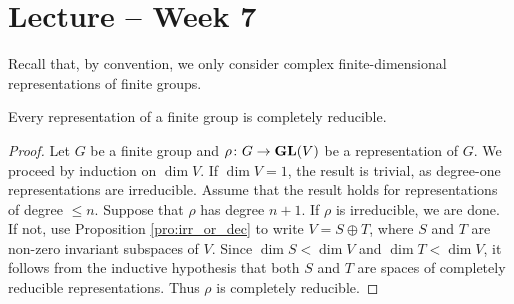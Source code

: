 \section{Lecture -- Week 7}
\label{7}

Recall that, by convention, we only consider complex 
finite-dimensional representations of finite groups.

\begin{theorem}[Maschke]
    Every representation of a finite group is completely reducible.
\end{theorem}

\begin{proof}
    Let $G$ be a finite group and $\rho\colon G\to\mathbf{GL}(V)$ be a representation of $G$. We proceed
    by induction on $\dim V$.
    If $\dim V=1$, the result is trivial, as degree-one representations are irreducible. Assume that
    the result holds for representations of degree $\leq n$. Suppose that $\rho$ has degree $n+1$. 
    If $\rho$ is irreducible, we are done. If not, use 
    Proposition \ref{pro:irr_or_dec} to 
    write $V=S\oplus T$, where $S$ and $T$
    are non-zero invariant subspaces of $V$. Since $\dim S<\dim V$ and $\dim T<\dim V$, it follows from
    the inductive hypothesis that
    both $S$ and $T$ are spaces of completely reducible representations. 
    Thus $\rho$ is completely reducible.
\end{proof}

